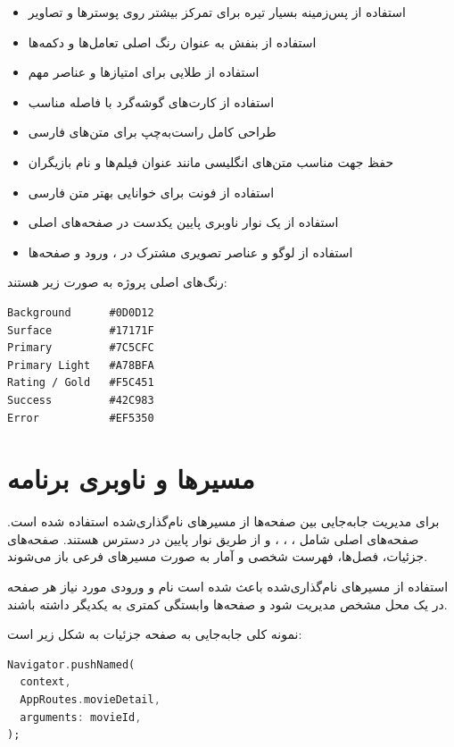 \documentclass[a4paper,14pt]{extarticle}
\begin{document}
\begin{itemize}
    \item استفاده از پس‌زمینه بسیار تیره برای تمرکز بیشتر روی پوسترها و تصاویر
    \item استفاده از بنفش به عنوان رنگ اصلی تعامل‌ها و دکمه‌ها
    \item استفاده از طلایی برای امتیازها و عناصر مهم
    \item استفاده از کارت‌های گوشه‌گرد با فاصله مناسب
    \item طراحی کامل راست‌به‌چپ برای متن‌های فارسی
    \item حفظ جهت مناسب متن‌های انگلیسی مانند عنوان فیلم‌ها و نام بازیگران
    \item استفاده از فونت  برای خوانایی بهتر متن فارسی
    \item استفاده از یک نوار ناوبری پایین یکدست در صفحه‌های اصلی
    \item استفاده از لوگو و عناصر تصویری مشترک در ، ورود و  صفحه‌ها
\end{itemize}

رنگ‌های اصلی پروژه به صورت زیر هستند:

\begin{latin}
\begin{lstlisting}[style=nice]
Background      #0D0D12
Surface         #17171F
Primary         #7C5CFC
Primary Light   #A78BFA
Rating / Gold   #F5C451
Success         #42C983
Error           #EF5350
\end{lstlisting}
\end{latin}

\section*{مسیرها و ناوبری برنامه}

برای مدیریت جابه‌جایی بین صفحه‌ها از مسیرهای نام‌گذاری‌شده استفاده شده است. صفحه‌های اصلی شامل ، ، ،  و  از طریق نوار پایین در دسترس هستند. صفحه‌های جزئیات، فصل‌ها، فهرست شخصی و آمار به صورت مسیرهای فرعی باز می‌شوند.

استفاده از مسیرهای نام‌گذاری‌شده باعث شده است نام و ورودی مورد نیاز هر صفحه در یک محل مشخص مدیریت شود و صفحه‌ها وابستگی کمتری به یکدیگر داشته باشند.

نمونه کلی جابه‌جایی به صفحه جزئیات به شکل زیر است:

\begin{latin}
\begin{lstlisting}[style=nice, language=Dart]
Navigator.pushNamed(
  context,
  AppRoutes.movieDetail,
  arguments: movieId,
);
\end{lstlisting}
\end{latin}
\end{document}
